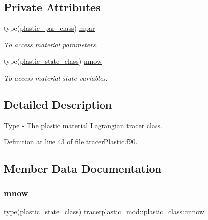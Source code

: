 \subsection*{Private Attributes}
\begin{DoxyCompactItemize}
\item 
type(\mbox{\hyperlink{structtracerplastic__mod_1_1plastic__par__class}{plastic\+\_\+par\+\_\+class}}) \mbox{\hyperlink{structtracerplastic__mod_1_1plastic__class_aa7e8b3a74a085714eac5917aaa2fc8c6}{mpar}}
\begin{DoxyCompactList}\small\item\em To access material parameters. \end{DoxyCompactList}\item 
type(\mbox{\hyperlink{structtracerplastic__mod_1_1plastic__state__class}{plastic\+\_\+state\+\_\+class}}) \mbox{\hyperlink{structtracerplastic__mod_1_1plastic__class_aa2e33df26e814fa1380e8184c54ee42e}{mnow}}
\begin{DoxyCompactList}\small\item\em To access material state variables. \end{DoxyCompactList}\end{DoxyCompactItemize}


\subsection{Detailed Description}
Type -\/ The plastic material Lagrangian tracer class. 

Definition at line 43 of file tracer\+Plastic.\+f90.



\subsection{Member Data Documentation}
\mbox{\label{structtracerplastic__mod_1_1plastic__class_aa2e33df26e814fa1380e8184c54ee42e}} 
\subsubsection{\texorpdfstring{mnow}{mnow}}
{\footnotesize\ttfamily type(\mbox{\hyperlink{structtracerplastic__mod_1_1plastic__state__class}{plastic\+\_\+state\+\_\+class}}) tracerplastic\+\_\+mod\+::plastic\+\_\+class\+::mnow\hspace{0.3cm}{\ttfamily [private]}}



